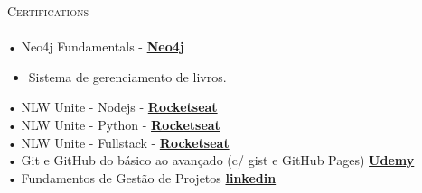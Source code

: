 \documentclass[a4paper]{article}
\newcommand{\lineunder} {
    \vspace*{-8pt} \\
    \hspace*{-18pt} \hrulefill \\
}
\newcommand{\header} [1] {
    {\hspace*{-18pt}\vspace*{6pt} \textsc{#1}}
    \vspace*{-6pt} \lineunder
}
\begin{document}
\vspace*{3mm}

%
%
\header{Certifications}
\vspace{2mm}
• Neo4j Fundamentals - \textbf{\href{https://graphacademy.neo4j.com/c/9d25b359-5995-4053-8475-7b2bf61f163e/}{Neo4j}}\\
\begin{itemize} \itemsep -3pt
    \item[] Sistema de gerenciamento de livros.
\end{itemize}
\vspace*{1mm}
• NLW Unite - Nodejs - \textbf{\href{https://app.rocketseat.com.br/certificates/a53012ec-27a9-419e-9a8c-86f28508a406}{Rocketseat}}\\
\vspace*{1mm}
• NLW Unite - Python - \textbf{\href{https://app.rocketseat.com.br/certificates/c5f21b9b-53c5-4ed7-bc45-430d87cccf77}{Rocketseat}}\\
\vspace*{1mm}
• NLW Unite - Fullstack - \textbf{\href{https://app.rocketseat.com.br/certificates/d3577eb6-c50f-42f3-b595-b96297ef0e05}{Rocketseat}}\\
\vspace*{1mm}
• Git e GitHub do básico ao avançado (c/ gist e GitHub Pages) \textbf{\href{https://www.udemy.com/certificate/UC-db57cce7-1471-47ff-9828-0e3a4d7da628/}{Udemy}}\\
\vspace*{1mm}
• Fundamentos de Gestão de Projetos
\textbf{\href{https://www.linkedin.com/learning/certificates/0fc1a744c87dc72f53e8c694fd58809808a183327167377cb224c1ac43e732b6}{linkedin}}\\

\vspace{2mm}

\
\end{document}

